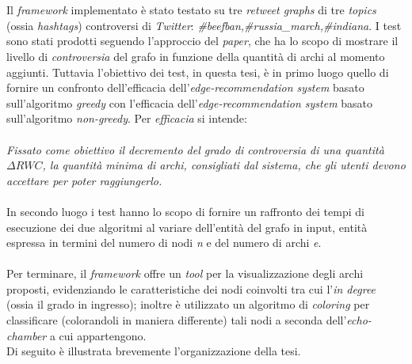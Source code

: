 \\\\Il \textit{framework} implementato è stato testato su tre \textit{retweet graphs} di tre \textit{topics} (ossia \textit{hashtags}) controversi di \textit{Twitter}: \textit{\#beefban,\#russia\_march,\#indiana}. I test sono stati prodotti seguendo l'approccio del \textit{paper}\cite{garimella:paper}, che ha lo scopo di mostrare il livello di \textit{controversia} del grafo in funzione della quantità di archi al momento aggiunti. Tuttavia l'obiettivo dei test, in questa tesi, è in primo luogo quello di fornire un confronto dell'efficacia dell'\textit{edge-recommendation system} basato sull'algoritmo \textit{greedy} con l'efficacia dell'\textit{edge-recommendation system} basato sull'algoritmo \textit{non-greedy}. Per \textit{efficacia} si intende:
\\\\
\textit{Fissato come obiettivo il decremento del grado di controversia di una quantità $\Delta RWC$, la quantità minima di archi, consigliati dal sistema, che gli utenti devono accettare per poter raggiungerlo.}
\\\\
In secondo luogo i test hanno lo scopo di fornire un raffronto dei tempi di esecuzione dei due algoritmi al variare dell'entità del grafo in input, entità espressa in termini del numero di nodi \textit{n} e del numero di archi \textit{e}.
\\\\Per terminare, il \textit{framework} offre un \textit{tool} per la visualizzazione degli archi proposti, evidenziando le caratteristiche dei nodi coinvolti tra cui l'\textit{in degree} (ossia il grado in ingresso); inoltre è utilizzato un algoritmo di \textit{coloring} per classificare (colorandoli in maniera differente) tali nodi a seconda dell'\textit{echo-chamber} a cui appartengono.
\\Di seguito è illustrata brevemente l'organizzazione della tesi.
